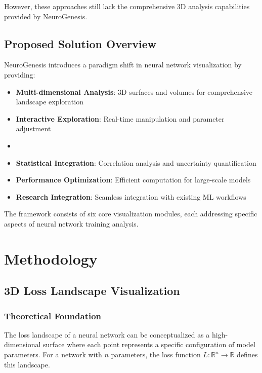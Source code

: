 \documentclass[12pt,a4paper]{article}
\begin{document}
However, these approaches still lack the comprehensive 3D analysis capabilities provided by NeuroGenesis.

\subsection{Proposed Solution Overview}

NeuroGenesis introduces a paradigm shift in neural network visualization by providing:

\begin{itemize}
    \item \textbf{Multi-dimensional Analysis}: 3D surfaces and volumes for comprehensive landscape exploration
    \item \textbf{Interactive Exploration}: Real-time manipulation and parameter adjustment
    \item \item \textbf{Statistical Integration}: Correlation analysis and uncertainty quantification
    \item \textbf{Performance Optimization}: Efficient computation for large-scale models
    \item \textbf{Research Integration}: Seamless integration with existing ML workflows
\end{itemize}

The framework consists of six core visualization modules, each addressing specific aspects of neural network training analysis.

\section{Methodology}
\label{sec:methodology}

\subsection{3D Loss Landscape Visualization}
\label{subsec:loss-landscape}

\subsubsection{Theoretical Foundation}

The loss landscape of a neural network can be conceptualized as a high-dimensional surface where each point represents a specific configuration of model parameters. For a network with \( n \) parameters, the loss function \( L: \mathbb{R}^n \rightarrow \mathbb{R} \) defines this landscape.
\end{document}

